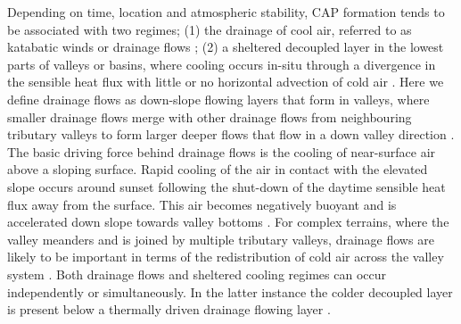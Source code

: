 \documentclass[times]{qjrms4}
\begin{document}
Depending on time, location and atmospheric stability, CAP formation tends to be associated with two regimes; (1) the drainage of cool air, referred to as katabatic winds \citep{heywood1933katabatic,manins1979katabatic} or drainage flows \citep{gudiksen1992measurements}; (2) a sheltered decoupled layer in the lowest parts of valleys or basins, where cooling occurs in-situ through a divergence in the sensible heat flux with little or no horizontal advection of cold air \citep{vosper2008numerical}. Here we define drainage flows as down-slope flowing layers that form in valleys, where smaller drainage flows merge with other drainage flows from neighbouring tributary valleys to form larger deeper flows that flow in a down valley direction \citep{orgill1992mesoscale,Vosper2013narrow}. The basic driving force behind drainage flows is the cooling of near-surface air above a sloping surface. Rapid cooling of the air in contact with the elevated slope occurs around sunset following the shut-down of the daytime sensible heat flux away from the surface. This air becomes negatively buoyant and is accelerated down slope towards valley bottoms \citep{vosper2008numerical,gudiksen1992measurements,Vosper2013narrow}. For complex terrains, where the valley meanders and is joined by multiple tributary valleys, drainage flows are likely to be important in terms of the redistribution of cold air across the valley system \citep{vosper2008numerical}. Both drainage flows and sheltered cooling regimes can occur independently or simultaneously. In the latter instance the colder decoupled layer is present below a thermally driven drainage flowing layer \citep{clements2003cold,Vosper2013narrow}.
\end{document}
